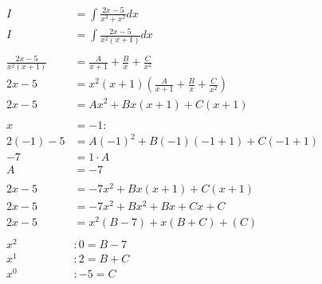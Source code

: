 \documentclass[12pt]{article}
\begin{document}
\begin{align}
    I                     & = \int \frac{2x-5}{x^3+x^2} dx                                        \\
    I                     & = \int \frac{2x-5}{x^2(x+1)} dx                                       \\
    \nonumber                                                                                     \\
    \frac{2x-5}{x^2(x+1)} & = \frac{A}{x+1} + \frac{B}{x} + \frac{C}{x^2}                         \\
    2x-5                  & = x^2(x+1)\left(\frac{A}{x+1} + \frac{B}{x} + \frac{C}{x^2}\right)    \\
    2x-5                  & = Ax^2 + Bx(x+1) + C(x+1)                                             \\
    \nonumber                                                                                     \\
    x                     & =-1:                                                                  \\
    2(-1) - 5             & = A(-1)^2 + B(-1)(-1+1) + C(-1+1)                                     \\
    -7                    & = 1 \cdot A                                                           \\
    A                     & = -7                                                                  \\
    \nonumber                                                                                     \\
    2x-5                  & = -7x^2 + Bx(x+1) + C(x+1)                                            \\
    2x-5                  & = -7x^2 + Bx^2+Bx + Cx+C                                              \\
    2x-5                  & = x^2(B-7) + x(B+C) + (C)                                             \\
    \nonumber                                                                                     \\
    x^2                   & : 0 = B - 7                                                           \\
    x^1                   & : 2 = B + C                                                           \\
    x^0                   & : -5 = C                                                              \\

\end{align}
\end{document}

